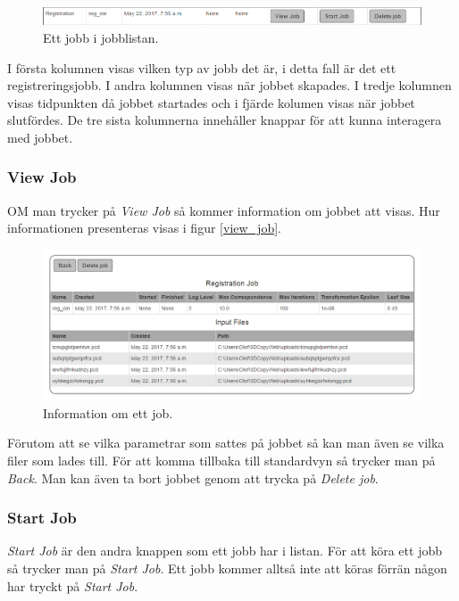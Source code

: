 \documentclass[a4paper,titlepage,12pt]{article}
\begin{document}
	\begin{figure}[H]
		\centering
		\includegraphics[width=160mm]{images/job_in_list.PNG}
		\caption{Ett jobb i jobblistan.}
		\label{fig:job_in_list}
	\end{figure}

	I första kolumnen visas vilken typ av jobb det är, i detta fall är det ett registreringsjobb. I andra kolumnen visas när jobbet skapades. I tredje kolumnen visas tidpunkten då jobbet startades och i fjärde kolumen visas när jobbet slutfördes. De tre sista kolumnerna innehåller knappar för att kunna interagera med jobbet.
	
	\subsubsection{View Job}
	
	OM man trycker på \textit{View Job} så kommer information om jobbet att visas. Hur informationen presenteras visas i figur \ref{view_job}.
	
	\begin{figure}[H]
		\centering
		\includegraphics[width=160mm]{images/view_job.PNG}
		\caption{Information om ett job.}
		\label{fig:view_job}
	\end{figure}

	Förutom att se vilka parametrar som sattes på jobbet så kan man även se vilka filer som lades till. För att komma tillbaka till standardvyn så trycker man på \textit{Back}. Man kan även ta bort jobbet genom att trycka på \textit{Delete job}.
	
	\subsubsection{Start Job}
	
	\textit{Start Job} är den andra knappen som ett jobb har i listan. För att köra ett jobb så trycker man på \textit{Start Job}. Ett jobb kommer alltså inte att köras förrän någon har tryckt på \textit{Start Job}.
	
\end{document}
